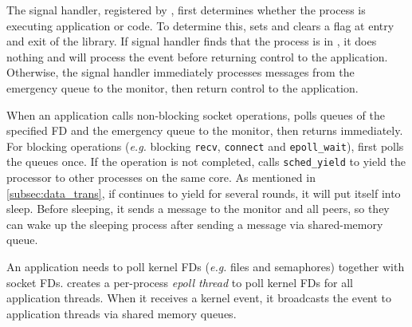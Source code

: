 The signal handler, registered by \libipc{}, first determines whether the process is executing application or \libipc{} code. To determine this, \libipc{} sets and clears a flag at entry and exit of the library. If signal handler finds that the process is in \libipc, it does nothing and \libipc{} will process the event before returning control to the application. Otherwise, the signal handler immediately processes messages from the emergency queue to the monitor, then return control to the application. 

When an application calls non-blocking socket operations, \libipc{} polls queues of the specified FD and the emergency queue to the monitor, then returns immediately. For blocking operations (\textit{e.g.} blocking \texttt{recv}, \texttt{connect} and \texttt{epoll\_wait}), \libipc{} first polls the queues once. If the operation is not completed, \libipc{} calls \texttt{sched\_yield} to yield the processor to other processes on the same core. %
As mentioned in \ref{subsec:data_trans}, if \libipc{} continues to yield for several rounds, it will put itself into sleep. Before sleeping, it sends a message to the monitor and all peers, so they can wake up the sleeping process after sending a message via shared-memory queue.

An application needs to poll kernel FDs (\textit{e.g.} files and semaphores) together with socket FDs.
\libipc{} creates a per-process \textit{epoll thread} to poll kernel FDs for all application threads. When it receives a kernel event, it broadcasts the event to application threads via shared memory queues.%




